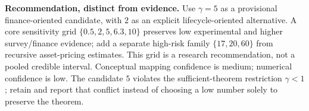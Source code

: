 \noindent\textbf{Recommendation, distinct from evidence.}
Use $\gamma=5$ as a provisional finance-oriented candidate, with $2$ as an
explicit lifecycle-oriented alternative. A core sensitivity grid
$\{0.5,2,5,6.3,10\}$ preserves low experimental and higher survey/finance
evidence; add a separate high-risk family $\{17,20,60\}$ from recursive
asset-pricing estimates. This grid is a research recommendation, not a pooled
credible interval. Conceptual mapping confidence is medium; numerical
confidence is low. The candidate $5$ violates the sufficient-theorem
restriction $\gamma<1$; retain and report that conflict instead of choosing
a low number solely to preserve the theorem.
